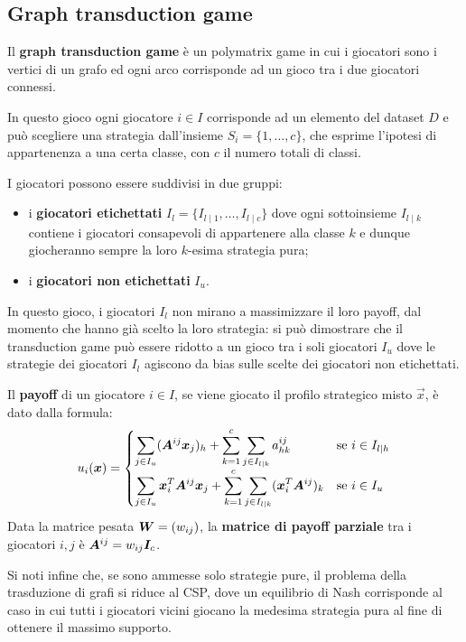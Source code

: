 \subsection{Graph transduction game}

Il \textbf{graph transduction game} è un polymatrix game in cui i giocatori sono i vertici di un grafo ed ogni arco corrisponde ad un gioco tra i due giocatori connessi.

In questo gioco ogni giocatore $i \in I$ corrisponde ad un elemento del dataset $D$ e può scegliere una strategia dall'insieme $S_i = \{1, \dots, c\}$, che esprime l'ipotesi di appartenenza a una certa classe, con $c$ il numero totali di classi.

I giocatori possono essere suddivisi in due gruppi:
\begin{itemize}
	\item i \textbf{giocatori etichettati} $I_l = \{I_{l \mid 1}, \dots, I_{l \mid c}\}$ dove ogni sottoinsieme $I_{l \mid k}$ contiene i giocatori consapevoli di appartenere alla classe $k$ e dunque giocheranno sempre la loro $k$-esima strategia pura;
	\item i \textbf{giocatori non etichettati} $I_u$.
\end{itemize}
In questo gioco, i giocatori $I_l$ non mirano a massimizzare il loro payoff, dal momento che hanno già scelto la loro strategia: si può dimostrare che il transduction game può essere ridotto a un gioco tra i soli giocatori $I_u$ dove le strategie dei giocatori $I_l$ agiscono da bias sulle scelte dei giocatori non etichettati.

Il \textbf{payoff} di un giocatore $i \in I$, se viene giocato il profilo strategico misto $\vec{x}$, è dato dalla formula:
\begin{displaymath}
	u_i(\vec{x}) = \begin{cases}
		\displaystyle\sum_{j \in I_u} (\mat{A}^{ij} \vec{x}_j)_h + \displaystyle\sum_{k = 1}^c \sum_{j \in I_{l \mid k}} a_{hk}^{ij} & \text{se } i \in I_{l \mid h} \\
		\displaystyle\sum_{j \in I_u} \vec{x}_i^T \mat{A}^{ij} \vec{x}_j + \displaystyle\sum_{k = 1}^c \displaystyle\sum_{j \in I_{l \mid k}} (\vec{x}_i^T \mat{A}^{ij})_k & \text{se } i \in I_u
	\end{cases}
\end{displaymath}
Data la matrice pesata $\mat{W} = (w_{ij})$, la \textbf{matrice di payoff parziale} tra i giocatori $i, j$ è $\mat{A}^{ij} = w_{ij} \mat{I}_c$.

Si noti infine che, se sono ammesse solo strategie pure, il problema della trasduzione di grafi si riduce al CSP, dove un equilibrio di Nash corrisponde al caso in cui tutti i giocatori vicini giocano la medesima strategia pura al fine di ottenere il massimo supporto.

